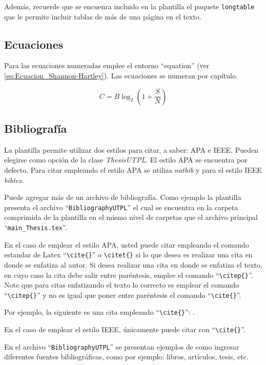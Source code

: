 Además, recuerde que se encuenra incluido en la plantilla el paquete \texttt{longtable} que le permite incluir tablas de más de una página en el texto. 

\subsection{Ecuaciones}
Para las ecuaciones numeradas emplee el entorno ``equation'' (ver \eqref{eq:Ecuacion_Shannon-Hartley}). Las ecuaciones se numeran por capítulo.  

\begin{equation}\label{eq:Ecuacion_Shannon-Hartley}
C = B \log_{2} \left( 1 + \frac{S}{N} \right) 
\end{equation}


\subsection{Bibliografía}
\label{sec:Bibliografia}
La plantilla permite utilizar dos estilos para citar, a saber: APA e IEEE. Pueden elegirse como opción de la clase \textit{ThesisUTPL}. El estilo APA se encuentra por defecto. Para citar empleando el estilo APA se utiliza \textit{natbib} y para el estilo IEEE \textit{bibtex}. 

Puede agregar más de un archivo de bibliografía. Como ejemplo la plantilla presenta el archivo ``\lstinline|BibliographyUTPL|'' el cual se encuentra en la carpeta comprimida de la plantilla en el mismo nivel de carpetas que el archivo principal ``\lstinline|main_Thesis.tex|''. 
 
En el caso de emplear el estilo APA, usted puede citar empleando el comando estandar de Latex ``\lstinline|\cite{}|'' o \lstinline|\citet{}| si lo que desea es realizar una cita en donde se enfatiza al autor. Si desea realizar una cita en donde se enfatiza el texto, en cuyo caso la cita debe salir entre paréntesis, emplee el comando ``\lstinline|\citep{}|''. Note que para citas enfatizando el texto lo correcto es emplear el comando ``\lstinline|\citep{}|'' y no es igual que poner entre paréntesis el comando ``\lstinline|\cite{}|''. 

Por ejemplo, la siguiente es una cita empleando ``\lstinline|\cite{}|'': \cite{sandoval2017hybrid}. 

En el caso de emplear el estilo IEEE, únicamente puede citar con ``\lstinline|\cite{}|''. 

En el archivo ``\lstinline|BibliographyUTPL|'' se presentan ejemplos de como ingresar diferentes fuentes bibliográficas, como por ejemplo: libros, artículos, tesis, etc. 
